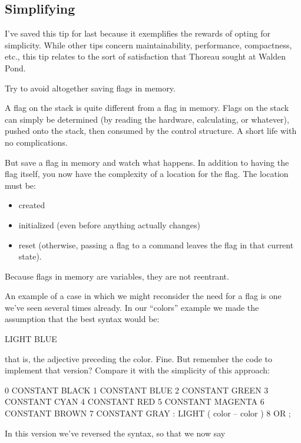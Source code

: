 \subsection{Simplifying}%
%

I've saved this tip for last because it exemplifies the rewards of opting
for simplicity. While other tips concern maintainability, performance,
compactness, etc., this tip relates to the sort of satisfaction that
Thoreau sought at Walden Pond.

\begin{tip}
Try to avoid altogether saving flags in memory.
\end{tip}
A flag on the stack is quite different from a flag in memory. Flags on the
stack can simply be determined (by reading the hardware, calculating, or
whatever), pushed onto the stack, then consumed by the control structure.
A short life with no complications.

But save a flag in memory and watch what happens. In addition to
having the flag itself, you now have the complexity of a location for the
flag. The location must be:

\begin{itemize}
\item created
\item initialized (even before anything actually changes)
\item reset (otherwise, passing a flag to a command leaves the flag in
that current state).
\end{itemize}
Because flags in memory are variables, they are not reentrant.

An example of a case in which we might reconsider the need for a flag is
one we've seen several times already. In our ``colors'' example we made
the assumption that the best syntax would be:

\begin{Code}
LIGHT BLUE
\end{Code}
that is, the adjective  preceding the color. Fine. But
remember the code to implement that version? Compare it with the
simplicity of this approach:

\begin{Code}
0 CONSTANT BLACK    1 CONSTANT BLUE    2 CONSTANT GREEN
3 CONSTANT CYAN     4 CONSTANT RED     5 CONSTANT MAGENTA
6 CONSTANT BROWN    7 CONSTANT GRAY
: LIGHT   ( color -- color )  8 OR ;
\end{Code}
In this version we've reversed the syntax, so that we now say

